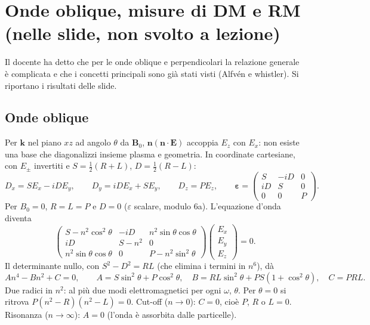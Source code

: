 \section{Onde oblique, misure di DM e RM (nelle slide, non svolto a lezione)}
Il docente ha detto che per le onde oblique e perpendicolari la relazione generale è complicata e che i concetti principali sono già stati visti (Alfv\'en e whistler). Si riportano i risultati delle slide.

\subsection{Onde oblique}
Per $\mathbf{k}$ nel piano $xz$ ad angolo $\theta$ da $\mathbf{B}_0$, $\mathbf{n}(\mathbf{n}\cdot\mathbf{E})$ accoppia $E_z$ con $E_x$: non esiste una base che diagonalizzi insieme plasma e geometria. In coordinate cartesiane, con $E_\pm$ invertiti e $S=\frac12(R+L)$, $D=\frac12(R-L)$:
\begin{equation}
D_x=SE_x-iDE_y,\qquad D_y=iDE_x+SE_y,\qquad D_z=PE_z,\qquad\boldsymbol\varepsilon=\begin{pmatrix}S&-iD&0\\iD&S&0\\0&0&P\end{pmatrix}.
\end{equation}
Per $B_0=0$, $R=L=P$ e $D=0$ ($\varepsilon$ scalare, modulo 6a). L'equazione d'onda diventa
\begin{equation}
\begin{pmatrix}S-n^2\cos^2\theta&-iD&n^2\sin\theta\cos\theta\\iD&S-n^2&0\\n^2\sin\theta\cos\theta&0&P-n^2\sin^2\theta\end{pmatrix}\begin{pmatrix}E_x\\E_y\\E_z\end{pmatrix}=0 .
\end{equation}
Il determinante nullo, con $S^2-D^2=RL$ (che elimina i termini in $n^6$), dà
\begin{equation}
An^4-Bn^2+C=0,\qquad A=S\sin^2\theta+P\cos^2\theta,\quad B=RL\sin^2\theta+PS(1+\cos^2\theta),\quad C=PRL .
\end{equation}
Due radici in $n^2$: al più due modi elettromagnetici per ogni $\omega$, $\theta$. Per $\theta=0$ si ritrova $P(n^2-R)(n^2-L)=0$. Cut-off ($n\to0$): $C=0$, cioè $P$, $R$ o $L=0$. Risonanza ($n\to\infty$): $A=0$ (l'onda è assorbita dalle particelle).

